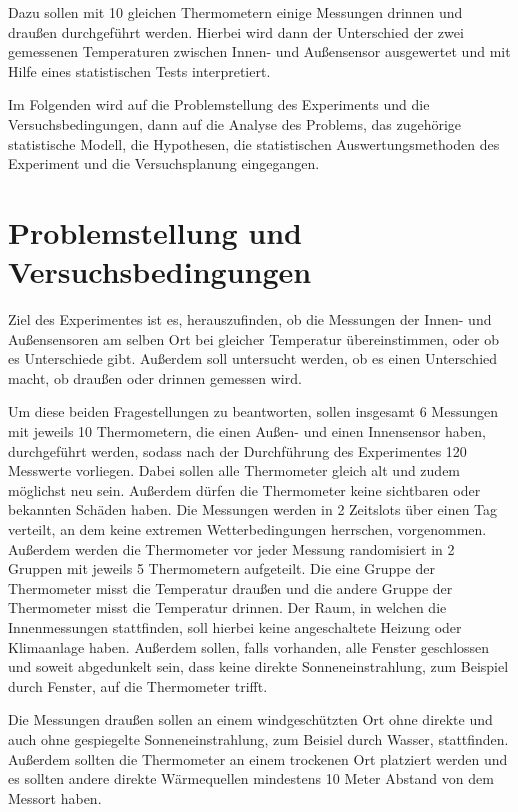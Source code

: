 \documentclass[ ngerman, fontsize= 12pt, paper=a4, headings=big, titlepage=true]{article}
\begin{document}
	Dazu sollen mit 10 gleichen Thermometern einige Messungen drinnen und draußen durchgeführt werden. Hierbei wird dann der Unterschied der zwei gemessenen Temperaturen zwischen Innen- und Außensensor ausgewertet und mit Hilfe eines statistischen Tests interpretiert. \newline 
	
	Im Folgenden wird auf die Problemstellung des Experiments und die Versuchsbedingungen, dann auf die Analyse des Problems, das zugehörige statistische Modell, die Hypothesen, die statistischen Auswertungsmethoden des Experiment und die Versuchsplanung eingegangen.
	
	\section{Problemstellung und Versuchsbedingungen}
	Ziel des Experimentes ist es, herauszufinden, ob die Messungen der Innen- und Außensensoren am selben Ort bei gleicher Temperatur übereinstimmen, oder ob es Unterschiede gibt. Außerdem soll untersucht werden, ob es einen Unterschied macht, ob draußen oder drinnen gemessen wird.\newline
	
	Um diese beiden Fragestellungen zu beantworten, sollen insgesamt 6 Messungen mit jeweils 10 Thermometern, die einen Außen- und einen Innensensor haben, durchgeführt werden, sodass nach der Durchführung des Experimentes 120 Messwerte vorliegen. Dabei sollen alle Thermometer gleich alt und zudem möglichst neu sein. Außerdem dürfen die Thermometer keine sichtbaren oder bekannten Schäden haben. Die Messungen werden in 2 Zeitslots über einen Tag verteilt, an dem keine extremen Wetterbedingungen herrschen, vorgenommen.  Außerdem werden die Thermometer vor jeder Messung randomisiert in 2 Gruppen mit jeweils 5 Thermometern aufgeteilt. Die eine Gruppe der Thermometer misst die Temperatur draußen und die andere Gruppe der Thermometer misst die Temperatur drinnen. Der Raum, in welchen die Innenmessungen stattfinden, soll hierbei keine angeschaltete Heizung oder Klimaanlage haben. Außerdem sollen, falls vorhanden, alle Fenster geschlossen und soweit abgedunkelt sein, dass keine direkte Sonneneinstrahlung, zum Beispiel durch Fenster, auf die Thermometer trifft. \newline
	
	Die Messungen draußen sollen an einem windgeschützten Ort ohne direkte und auch ohne gespiegelte Sonneneinstrahlung, zum Beisiel durch Wasser, stattfinden. Außerdem sollten die Thermometer an einem trockenen Ort platziert werden und es sollten andere direkte Wärmequellen mindestens 10 Meter Abstand von dem Messort haben. \newline
	
\end{document}
